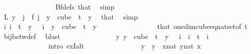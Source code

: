 \begin{isabellebody}
\ \ \ \ \ \ \ \ \ \ \ \ \ \ \isamarkupfalse%
\ Bf{\isacharunderscore}{\kern0pt}defs\ that\ \isamarkupfalse%
\ simp\isanewline
\ \ \ \ \ \ \ \ \ \ \ \ \isamarkupfalse%
\ \isamarkupfalse%
\ {\isachardoublequoteopen}L\ {\isacharparenleft}{\kern0pt}y\ {}{\isacharparenright}{\kern0pt}\ j\ {\isacharequal}{\kern0pt}\ f\ j{\isachardoublequoteclose}\ \ {\isachardoublequoteopen}y\ {\isasymin}\ cube\ {}\ t{\isachardoublequoteclose}\ \ y\ \isamarkupfalse%
\ that\ \isamarkupfalse%
\ simp\isanewline
\ \ \ \ \ \ \ \ \ \ \ \ \isamarkupfalse%
\ \isamarkupfalse%
\ {\isachardoublequoteopen}{\isasymexists}{\isacharbang}{\kern0pt}i{\isachardot}{\kern0pt}\ i\ {\isacharless}{\kern0pt}\ t\ {\isasymand}\ y\ {}\ {\isacharequal}{\kern0pt}\ i{\isachardoublequoteclose}\ \ {\isachardoublequoteopen}y\ {\isasymin}\ cube\ {}\ t{\isachardoublequoteclose}\ \ y\ \isanewline
\ \ \ \ \ \ \ \ \ \ \ \ \ \ \isamarkupfalse%
\ that\ one{\isacharunderscore}{\kern0pt}dim{\isacharunderscore}{\kern0pt}cube{\isacharunderscore}{\kern0pt}eq{\isacharunderscore}{\kern0pt}nat{\isacharunderscore}{\kern0pt}set{\isacharbrackleft}{\kern0pt}of\ {\isachardoublequoteopen}t{\isachardoublequoteclose}{\isacharbrackright}{\kern0pt}\ \isamarkupfalse%
\ bij{\isacharunderscore}{\kern0pt}betw{\isacharunderscore}{\kern0pt}def\ \isamarkupfalse%
\ blast\isanewline
\ \ \ \ \ \ \ \ \ \ \ \ \isamarkupfalse%
\ \isamarkupfalse%
\ {\isachardoublequoteopen}{\isasymexists}{\isacharbang}{\kern0pt}y{\isachardot}{\kern0pt}\ y\ {\isasymin}\ cube\ {}\ t\ {\isasymand}\ y\ {}\ {\isacharequal}{\kern0pt}\ i{\isachardoublequoteclose}\ \ {\isachardoublequoteopen}i\ {\isacharless}{\kern0pt}\ t{\isachardoublequoteclose}\ \ i\ \isanewline
\ \ \ \ \ \ \ \ \ \ \ \ \isamarkupfalse%
\ {\isacharparenleft}{\kern0pt}intro\ ex{}I{\isacharunderscore}{\kern0pt}alt{\isacharparenright}{\kern0pt}\isanewline
\ \ \ \ \ \ \ \ \ \ \ \ \ \ \isamarkupfalse%
\ y\ \ {\isachardoublequoteopen}y\ {\isasymequiv}\ {\isacharparenleft}{\kern0pt}{\isasymlambda}x{\isacharcolon}{\kern0pt}{\isacharcolon}{\kern0pt}nat{\isachardot}{\kern0pt}\ {\isasymlambda}y{\isasymin}{\isacharbraceleft}{\kern0pt}{\isachardot}{\kern0pt}{\isachardot}{\kern0pt}{\isacharless}{\kern0pt}{}{\isacharcolon}{\kern0pt}{\isacharcolon}{\kern0pt}nat{\isacharbraceright}{\kern0pt}{\isachardot}{\kern0pt}\ x{\isacharparenright}{\kern0pt}{\isachardoublequoteclose}\ \isanewline

\end{isabellebody}
